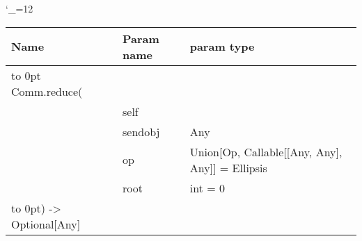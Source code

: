 \begingroup \catcode`\_=12 \tt
\begin{tabular}{lll}
\toprule
\textrm{Name}&\textrm{Param name}&\textrm{param type}\\
\midrule
\hbox to 0pt {Comm.reduce(\hss}\\
& self\\
& sendobj & Any\\
& op & Union[Op, Callable[[Any, Any], Any]] = Ellipsis\\
& root & int = 0\\
\hbox to 0pt{) -> Optional[Any]\hss}\\
\bottomrule
\end{tabular}
\endgroup
